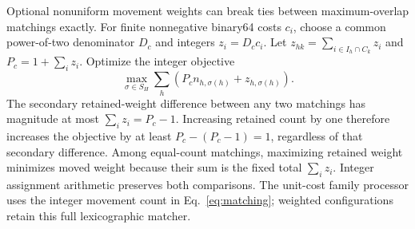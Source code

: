 \documentclass[11pt]{article}
\begin{document}
Optional nonuniform movement weights can break ties between maximum-overlap matchings exactly. For finite nonnegative binary64 costs $c_i$, choose a common power-of-two denominator $D_c$ and integers $z_i=D_cc_i$. Let $z_{hk}=\sum_{i\in I_h\cap C_k}z_i$ and $P_c=1+\sum_iz_i$. Optimize the integer objective
\begin{equation}
 \max_{\sigma\in S_H}\sum_h(P_cn_{h,\sigma(h)}+z_{h,\sigma(h)}).
\end{equation}
The secondary retained-weight difference between any two matchings has magnitude at most $\sum_iz_i=P_c-1$. Increasing retained count by one therefore increases the objective by at least $P_c-(P_c-1)=1$, regardless of that secondary difference. Among equal-count matchings, maximizing retained weight minimizes moved weight because their sum is the fixed total $\sum_iz_i$. Integer assignment arithmetic preserves both comparisons. The unit-cost family processor uses the integer movement count in Eq.~\eqref{eq:matching}; weighted configurations retain this full lexicographic matcher.
\end{document}

